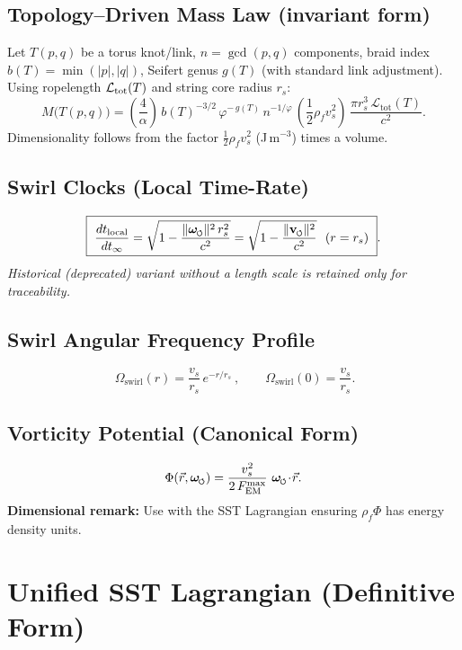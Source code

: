 \documentclass[11pt, a4paper]{article}
\newcommand{\swirlarrow}{%
    \mathchoice{\mkern-2mu\scriptstyle\boldsymbol{\circlearrowleft}}%
    {\mkern-2mu\scriptstyle\boldsymbol{\circlearrowleft}}%
    {\mkern-2mu\scriptscriptstyle\boldsymbol{\circlearrowleft}}%
    {\mkern-2mu\scriptscriptstyle\boldsymbol{\circlearrowleft}}%
}
\newcommand{\vswirl}{\mathbf{v}_{\swirlarrow}}
\newcommand{\omegas}{\boldsymbol{\omega}_{\swirlarrow}}  %
\newcommand{\vscore}{v_s}                                %
\newcommand{\rhof}{\rho_{\!f}}                           %
\newcommand{\rs}{r_s}                                    %
\begin{document}
    \subsection{Topology–Driven Mass Law (invariant form)}
    Let \(T(p,q)\) be a torus knot/link, \(n=\gcd(p,q)\) components, braid index \(b(T)=\min(|p|,|q|)\), Seifert genus \(g(T)\) (with standard link adjustment). Using ropelength \(\mathcal{L}_{\rm tot}(T)\) and string core radius \(\rs\):
    \[
        \boxed{
            M\big(T(p,q)\big)
            =\left(\frac{4}{\alpha}\right)\,
            b(T)^{-3/2}\,
            \varphi^{-\,g(T)}\,
            n^{-1/\varphi}\,
            \left(\frac{1}{2}\rhof \vscore^2\right)\,
            \frac{\pi \rs^3\,\mathcal{L}_{\mathrm{tot}}(T)}{c^2}.
        }
    \]
    Dimensionality follows from the factor \(\tfrac12\rhof \vscore^2\) (J\,m\(^{-3}\)) times a volume.

    \subsection{Swirl Clocks (Local Time-Rate)}
    \[
        \boxed{\ \frac{dt_{\text{local}}}{dt_{\infty}}
            = \sqrt{1 - \frac{\lVert\omegas\rVert^{2}\,\rs^{2}}{c^{2}}}
            = \sqrt{1 - \frac{\lVert\vswirl\rVert^{2}}{c^{2}}}\ \ (r=\rs)\ }.
    \]
    \emph{Historical (deprecated) variant without a length scale is retained only for traceability.}

    \subsection{Swirl Angular Frequency Profile}
    \[
        \boxed{\ \Omega_{\text{swirl}}(r) = \frac{\vscore}{\rs}\, e^{-r/\rs}\ },
        \qquad
        \Omega_{\text{swirl}}(0)=\frac{\vscore}{\rs}.
    \]

    \subsection{Vorticity Potential (Canonical Form)}
    \[
        \Phi(\vec r,\omegas) = \frac{\vscore^{2}}{2\,F_{\text{EM}}^{\max}}\ \omegas\!\cdot\!\vec r.
    \]
    \textbf{Dimensional remark:} Use with the SST Lagrangian ensuring \(\rhof\Phi\) has energy density units.

    \section{Unified SST Lagrangian (Definitive Form)}
    \label{sec:lagrangian}
\end{document}
